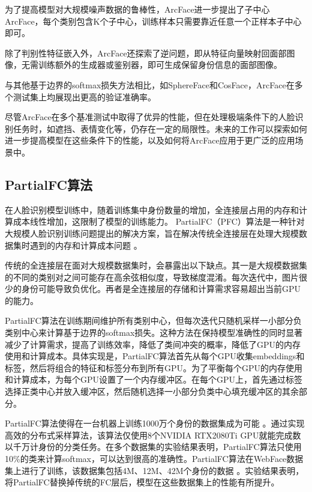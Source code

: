 \documentclass[a4paper]{article}
\begin{document}
为了提高模型对大规模噪声数据的鲁棒性，ArcFace进一步提出了子中心ArcFace，每个类别包含K个子中心，训练样本只需要靠近任意一个正样本子中心即可。

除了判别性特征嵌入外，ArcFace还探索了逆问题，即从特征向量映射回面部图像，无需训练额外的生成器或鉴别器，即可生成保留身份信息的面部图像。

与其他基于边界的softmax损失方法相比，如SphereFace和CosFace，ArcFace在多个测试集上均展现出更高的验证准确率\cite{firmansyah2023comparison}。

尽管ArcFace在多个基准测试中取得了优异的性能，但在处理极端条件下的人脸识别任务时，如遮挡、表情变化等，仍存在一定的局限性\cite{montero2022boosting}。未来的工作可以探索如何进一步提高模型在这些条件下的性能，以及如何将ArcFace应用于更广泛的应用场景中。

\subsection{PartialFC算法}

在人脸识别模型训练中，随着训练集中身份数量的增加，全连接层占用的内存和计算成本线性增加，这限制了模型的训练能力。
PartialFC（PFC）算法是一种针对大规模人脸识别训练问题提出的解决方案，旨在解决传统全连接层在处理大规模数据集时遇到的内存和计算成本问题\cite{an_2021_pfc_iccvw} \cite{an2022killing}。

传统的全连接层在面对大规模数据集时，会暴露出以下缺点。其一是大规模数据集的不同的类别对之间可能存在高余弦相似度，导致梯度混淆。每次迭代中，图片很少的身份可能导致负优化。再者是全连接层的存储和计算需求容易超出当前GPU的能力。

PartialFC算法在训练期间维护所有类别中心，但每次迭代只随机采样一小部分负类别中心来计算基于边界的softmax损失。这种方法在保持模型准确性的同时显著减少了计算需求，提高了训练效率，降低了类间冲突的概率，降低了GPU的内存使用和计算成本。具体实现是，PartialFC算法首先从每个GPU收集embeddings和标签，然后将组合的特征和标签分布到所有GPU。为了平衡每个GPU的内存使用和计算成本，为每个GPU设置了一个内存缓冲区。在每个GPU上，首先通过标签选择正类中心并放入缓冲区，然后随机选择一小部分负类中心填充缓冲区的其余部分。

PartialFC算法使得在一台机器上训练1000万个身份的数据集成为可能
。通过实现高效的分布式采样算法，该算法仅使用8个NVIDIA RTX2080Ti GPU就能完成数以千万计身份的分类任务。在多个数据集的实验结果表明，PartialFC算法只使用10\%的类来计算softmax，可以达到很高的准确性。PartialFC算法在WebFace数据集上进行了训练，该数据集包括4M、12M、42M个身份的数据
。实验结果表明，将PartialFC替换掉传统的FC层后，模型在这些数据集上的性能有所提升。
\end{document}
